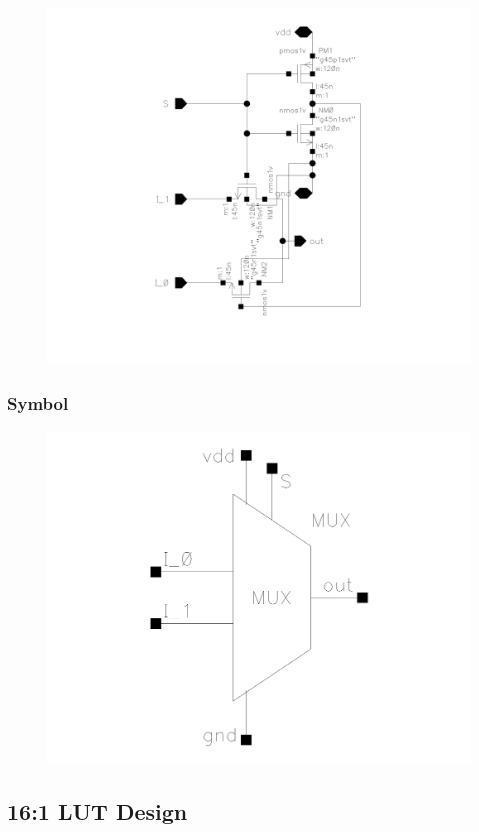 \documentclass[12pt]{article}
\begin{document}
\begin{figure}[H]
    \centering
    \includegraphics[width=0.8\linewidth]{writeup//figures/MUX_sch.png}
    \caption{}
\end{figure}

\subsubsection*{Symbol}

\begin{figure}[H]
    \centering
    \includegraphics[width=0.5\linewidth]{writeup//figures/MUX_sym.png}
    \caption{}
\end{figure}

\newpage

\subsection{16:1 LUT Design}
\end{document}
